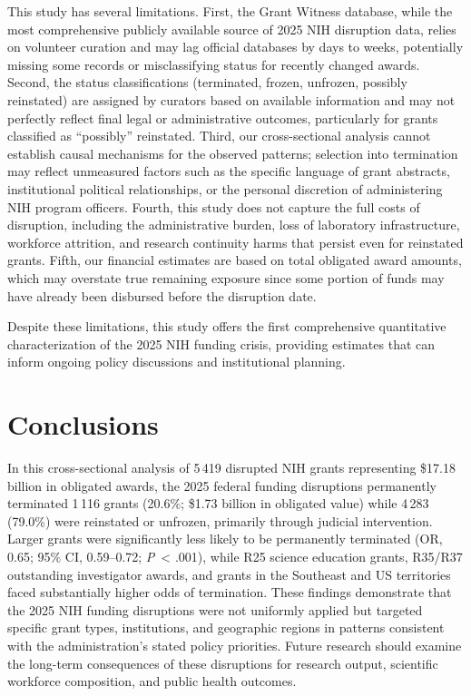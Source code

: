 \documentclass[10pt, letterpaper]{article}
\begin{document}
This study has several limitations. First, the Grant Witness database, while the most comprehensive publicly available source of 2025 NIH disruption data, relies on volunteer curation and may lag official databases by days to weeks, potentially missing some records or misclassifying status for recently changed awards. Second, the status classifications (terminated, frozen, unfrozen, possibly reinstated) are assigned by curators based on available information and may not perfectly reflect final legal or administrative outcomes, particularly for grants classified as ``possibly'' reinstated. Third, our cross-sectional analysis cannot establish causal mechanisms for the observed patterns; selection into termination may reflect unmeasured factors such as the specific language of grant abstracts, institutional political relationships, or the personal discretion of administering NIH program officers. Fourth, this study does not capture the full costs of disruption, including the administrative burden, loss of laboratory infrastructure, workforce attrition, and research continuity harms that persist even for reinstated grants. Fifth, our financial estimates are based on total obligated award amounts, which may overstate true remaining exposure since some portion of funds may have already been disbursed before the disruption date.

Despite these limitations, this study offers the first comprehensive quantitative characterization of the 2025 NIH funding crisis, providing estimates that can inform ongoing policy discussions and institutional planning.


\section*{Conclusions}

In this cross-sectional analysis of 5\,419 disrupted NIH grants representing \$17.18 billion in obligated awards, the 2025 federal funding disruptions permanently terminated 1\,116 grants (20.6\%; \$1.73 billion in obligated value) while 4\,283 (79.0\%) were reinstated or unfrozen, primarily through judicial intervention. Larger grants were significantly less likely to be permanently terminated (OR, 0.65; 95\% CI, 0.59--0.72; \textit{P}~< .001), while R25 science education grants, R35/R37 outstanding investigator awards, and grants in the Southeast and US territories faced substantially higher odds of termination. These findings demonstrate that the 2025 NIH funding disruptions were not uniformly applied but targeted specific grant types, institutions, and geographic regions in patterns consistent with the administration's stated policy priorities. Future research should examine the long-term consequences of these disruptions for research output, scientific workforce composition, and public health outcomes.
\end{document}
